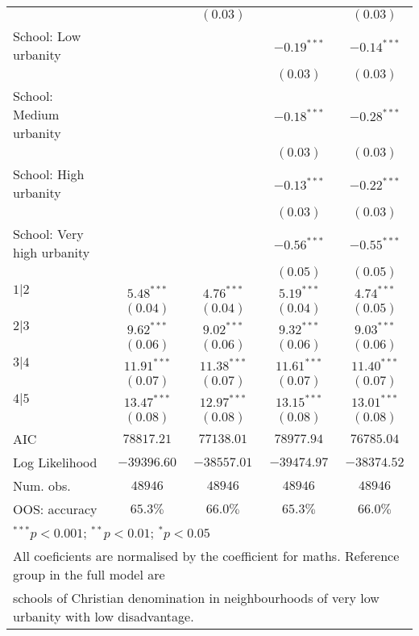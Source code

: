 \begin{table}
\begin{center}
\begin{tabular}{l c c c c}
&               & $(0.03)$      &               & $(0.03)$      \\
School: Low urbanity &               &               & $-0.19^{***}$ & $-0.14^{***}$ \\
&               &               & $(0.03)$      & $(0.03)$      \\
School: Medium urbanity &               &               & $-0.18^{***}$ & $-0.28^{***}$ \\
&               &               & $(0.03)$      & $(0.03)$      \\
School: High urbanity &               &               & $-0.13^{***}$ & $-0.22^{***}$ \\
&               &               & $(0.03)$      & $(0.03)$      \\
School: Very high urbanity &               &               & $-0.56^{***}$ & $-0.55^{***}$ \\
&               &               & $(0.05)$      & $(0.05)$      \\
\midrule
$1|2$             & $5.48^{***}$  & $4.76^{***}$  & $5.19^{***}$  & $4.74^{***}$  \\
                & $(0.04)$      & $(0.04)$      & $(0.04)$      & $(0.05)$      \\
$2|3$             & $9.62^{***}$  & $9.02^{***}$  & $9.32^{***}$  & $9.03^{***}$  \\
                & $(0.06)$      & $(0.06)$      & $(0.06)$      & $(0.06)$      \\
$3|4$             & $11.91^{***}$ & $11.38^{***}$ & $11.61^{***}$ & $11.40^{***}$ \\
                & $(0.07)$      & $(0.07)$      & $(0.07)$      & $(0.07)$      \\
$4|5$             & $13.47^{***}$ & $12.97^{***}$ & $13.15^{***}$ & $13.01^{***}$ \\
                & $(0.08)$      & $(0.08)$      & $(0.08)$      & $(0.08)$      \\
\hline
AIC             & $78817.21$    & $77138.01$    & $78977.94$    & $76785.04$    \\
Log Likelihood  & $-39396.60$   & $-38557.01$   & $-39474.97$   & $-38374.52$   \\
Num. obs.       & $48946$       & $48946$       & $48946$       & $48946$       \\
OOS: accuracy & $65.3\%$ & $66.0\%$ & $65.3\%$ & $66.0\%$ \\
\hline
\multicolumn{5}{l}{\scriptsize{$^{***}p<0.001$; $^{**}p<0.01$; $^{*}p<0.05$}} \\
\multicolumn{5}{l}{All coeficients are normalised by the coefficient for maths. Reference group in the full model are} \\
\multicolumn{5}{l}{schools of Christian denomination in neighbourhoods of very low urbanity with low disadvantage.}
\end{tabular}
\label{table:coefficients}
\end{center}
\end{table}
